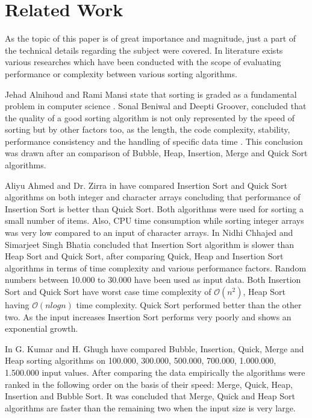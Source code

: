 \documentclass[]{article}
\begin{document}
	\pagebreak

	\section{Related Work}
As the topic of this paper is of great importance and magnitude, just a part of the technical details regarding the subject were covered. In literature exists various researches which have been conducted with the scope of evaluating performance or complexity between various sorting algorithms. 

Jehad Alnihoud and Rami Mansi state that sorting is graded as a fundamental problem in computer science \cite{alnihoud2010enhancement}. Sonal Beniwal and Deepti Groover, concluded that the quality of a good sorting algorithm is not only represented by the speed of sorting but by other factors too, as the length, the code complexity, stability, performance consistency and the handling of specific data time \cite{beniwal2013comparison}. This conclusion was drawn after an comparison of Bubble, Heap, Insertion, Merge and Quick Sort algorithms.

Aliyu Ahmed and Dr. Zirra in \cite{aliyu2013comparative} have compared Insertion Sort and Quick Sort algorithms on both integer and character arrays concluding that performance of Insertion Sort is better than Quick Sort. Both algorithms were used for sorting a small number of items. Also, CPU time consumption while sorting integer arrays was very low compared to an input of character arrays. In \cite{chhajed2013comparison} Nidhi Chhajed and Simarjeet Singh Bhatia concluded that Insertion Sort algorithm is slower than Heap Sort and Quick Sort, after comparing Quick, Heap and Insertion Sort algorithms in terms of time complexity and various performance factors. Random numbers between 10.000 to 30.000 have been used as input data. Both Insertion Sort and Quick Sort have worst case time complexity of $\mathcal{O}(n^2)$, Heap Sort having $\mathcal{O}(nlog{}n)$ time complexity. Quick Sort performed better than the other two. As the input increases Insertion Sort performs very poorly and shows an exponential growth. 

In \cite{kumar2013empirical} G. Kumar and H. Ghugh have compared Bubble, Insertion, Quick, Merge and Heap sorting algorithms on 100.000, 300.000, 500.000, 700.000, 1.000.000, 1.500.000 input values. After comparing the data empirically the algorithms were ranked in the following order on the basis of their speed: Merge, Quick, Heap, Insertion and Bubble Sort. It was concluded that Merge, Quick and Heap Sort algorithms are faster than the remaining two when the input size is very large. 
\end{document}
